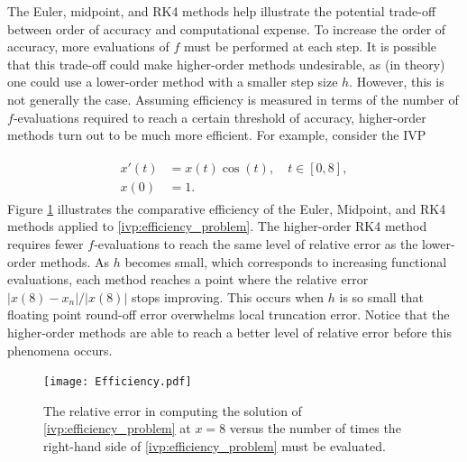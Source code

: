 The Euler, midpoint, and RK4 methods help illustrate the potential trade-off between order of accuracy and computational expense.
To increase the order of accuracy, more evaluations of $f$ must be performed at each step.
It is possible that this trade-off could make higher-order methods undesirable, as (in theory) one could use a lower-order method with a smaller step size $h$.
However, this is not generally the case.
Assuming efficiency is measured in terms of the number of $f$-evaluations required to reach a certain threshold of accuracy, higher-order methods turn out to be much more efficient.
For example, consider the IVP

\begin{align}
	\begin{split}
		x'(t) &= x(t) \cos(t), \quad t \in [0,8],\\
		x(0) &= 1. 
	\end{split}
	\label{ivp:efficiency_problem}
\end{align}
Figure \ref{ivp:efficiency_figure} illustrates the comparative efficiency of the Euler, Midpoint, and RK4 methods applied to \eqref{ivp:efficiency_problem}. 
The higher-order RK4 method requires fewer $f$-evaluations to reach the same level of relative error as the lower-order methods.
As $h$ becomes small, which corresponds to increasing functional evaluations, each method reaches a point where the relative error $|x(8)-x_n|/{|x(8)|}$ stops improving.
This occurs when $h$ is so small that floating point round-off error overwhelms local truncation error. Notice that the higher-order methods are able to reach a better level of relative error before this phenomena occurs.

\begin{figure}[h]
\centering
\texttt{[image: Efficiency.pdf]}
\caption{The relative error in computing the solution of \eqref{ivp:efficiency_problem} at $x = 8$ versus the number of times the right-hand side of \eqref{ivp:efficiency_problem} must be evaluated.  }
\label{ivp:efficiency_figure}
\end{figure}

